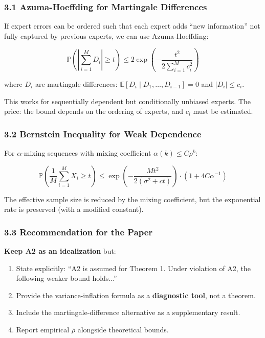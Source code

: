 \documentclass[
  12pt,
]{article}
\begin{document}
\subsubsection{3.1 Azuma-Hoeffding for Martingale Differences}

If expert errors can be ordered such that each expert adds ``new information'' not fully captured by previous experts, we can use Azuma-Hoeffding:

\begin{equation}
\mathbb{P}\left(\left|\sum_{i=1}^M D_i\right| \geq t\right) \leq 2\exp\left(-\frac{t^2}{2\sum_{i=1}^M c_i^2}\right)
\end{equation}

where \(D_i\) are martingale differences: \(\mathbb{E}[D_i \mid D_1,\ldots,D_{i-1}] = 0\) and \(|D_i| \leq c_i\).

This works for sequentially dependent but conditionally unbiased experts. The price: the bound depends on the ordering of experts, and \(c_i\) must be estimated.

\subsubsection{3.2 Bernstein Inequality for Weak Dependence}

For \(\alpha\)-mixing sequences with mixing coefficient \(\alpha(k) \leq C\rho^k\):

\begin{equation}
\mathbb{P}\left(\frac{1}{M}\sum_{i=1}^M X_i \geq t\right) \leq \exp\left(-\frac{M t^2}{2(\sigma^2 + c t)}\right) \cdot (1 + 4C\alpha^{-1})
\end{equation}

The effective sample size is reduced by the mixing coefficient, but the exponential rate is preserved (with a modified constant).

\subsubsection{3.3 Recommendation for the Paper}

\textbf{Keep A2 as an idealization} but:
\begin{enumerate}
\item State explicitly: ``A2 is assumed for Theorem 1. Under violation of A2, the following weaker bound holds...''
\item Provide the variance-inflation formula as a \textbf{diagnostic tool}, not a theorem.
\item Include the martingale-difference alternative as a supplementary result.
\item Report empirical \(\bar{\rho}\) alongside theoretical bounds.
\end{enumerate}
\end{document}

